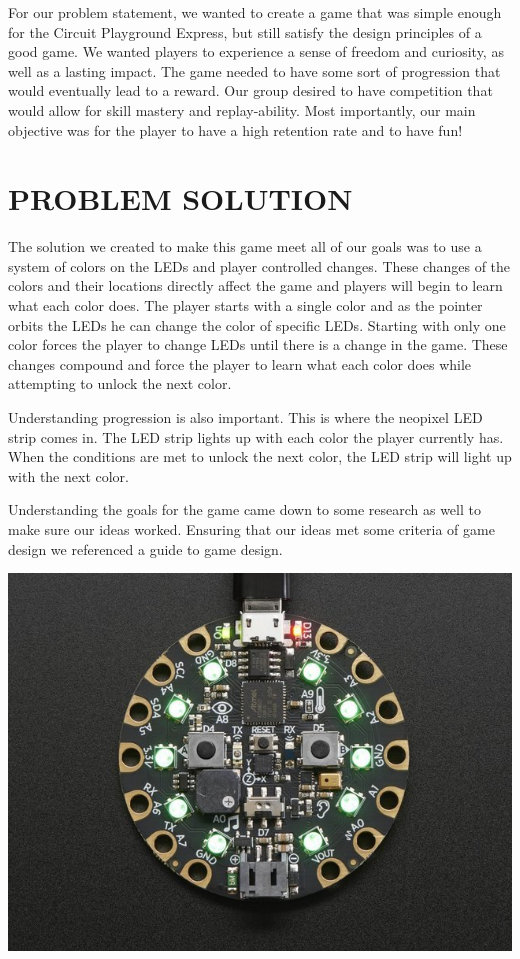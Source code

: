 \documentclass[12pt]{article}
\begin{document}
For our problem statement, we wanted to create a game that was simple enough for the Circuit Playground Express, but still satisfy the design principles of a good game.\cite{youtube} We wanted players to experience a sense of freedom and curiosity, as well as a lasting impact. The game needed to have some sort of progression that would eventually lead to a reward. Our group desired to have competition that would allow for skill mastery and replay-ability. Most importantly, our main objective was for the player to have a high retention rate and to have fun!

\section{PROBLEM SOLUTION}

The solution we created to make this game meet all of our goals was to use a system of colors on the LEDs and player controlled changes. These changes of the colors and their locations directly affect the game and players will begin to learn what each color does. The player starts with a single color and as the pointer orbits the LEDs he can change the color of specific LEDs. Starting with only one color forces the player to change LEDs until there is a change in the game. These changes compound and force the player to learn what each color does while attempting to unlock the next color. 

Understanding progression is also important. This is where the neopixel LED strip comes in. The LED strip lights up with each color the player currently has. When the conditions are met to unlock the next color, the LED strip will light up with the next color. 

Understanding the goals for the game came down to some research as well to make sure our ideas worked. Ensuring that our ideas met some criteria of game design we referenced a guide to game design\cite{Pillars}.

\includegraphics[scale = 2.75]{cpx01.jpg}
\end{document}
